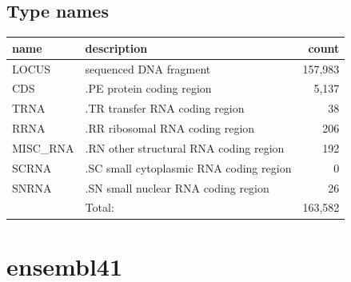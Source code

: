 \documentclass{article}
\begin{document}
\begin{Schunk}
\subsection{Type names}
\noindent\begin{tabular}{llr}
\hline \hline
name & description & count \\
\hline
LOCUS  &  sequenced DNA fragment  &  157,983 \\
CDS  &  .PE protein coding region  &  5,137 \\
TRNA  &  .TR transfer RNA coding region  &  38 \\
RRNA  &  .RR ribosomal RNA coding region  &  206 \\
MISC\_RNA  &  .RN other structural RNA coding region  &  192 \\
SCRNA  &  .SC small cytoplasmic RNA coding region  &  0 \\
SNRNA  &  .SN small nuclear RNA coding region  &  26 \\
\hline
 & Total: & 163,582 \\
\hline \hline
\end{tabular}

\section{ ensembl41 }

\end{Schunk}
\end{document}
